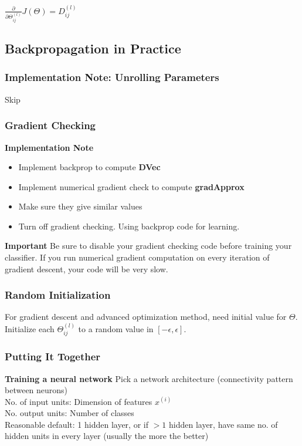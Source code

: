 \documentclass{article}
\begin{document}
$\frac{\partial}{\partial \Theta_{ij}^{(l)}}J(\Theta) = D_{ij}^{(l)}$

\subsection{Backpropagation in Practice}
\subsubsection{Implementation Note: Unrolling Parameters}
Skip
\subsubsection{Gradient Checking}
\textbf{Implementation Note}
\begin{itemize}
  \item Implement backprop to compute \textbf{DVec} 
  \item Implement numerical gradient check to compute \textbf{gradApprox}
  \item Make sure they give similar values
  \item Turn off gradient checking. Using backprop code for learning.
\end{itemize}

\textbf{Important}
Be sure to disable your gradient checking code before training your classifier. If you run numerical gradient computation on every iteration of gradient descent, your code will be very slow.

\subsubsection{Random Initialization}
For gradient descent and advanced optimization method, need initial value for $\Theta$.\\

Initialize each $\Theta_{ij}^{(l)}$ to a random value in $[-\epsilon, \epsilon].$

\subsubsection{Putting It Together}
\textbf{Training a neural network}
Pick a network architecture (connectivity pattern between neurons) \\
No. of input units: Dimension of features $x^{(i)}$ \\
No. output units: Number of classes \\
Reasonable default: 1 hidden layer, or if $> 1$ hidden layer, have same no. of hidden units in every layer (usually the more the better) \\  
\end{document}
